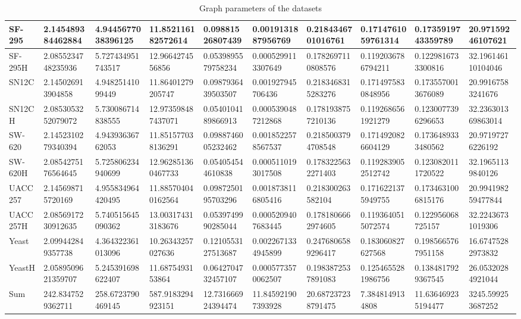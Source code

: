 \documentclass{article}
\begin{document}
\begin{table}[!ht]
\begin{tabular}{|l|l|l|l|l|l|l|l|l|l|}
        SF-295 & 2.145489384462884 & 4.9445677038396125 & 11.852116182572614 & 0.09881526807439 & 0.0019131887956769 & 0.2184346701016761 & 0.1714761059761314 & 0.1735919743359789 & 20.97159246107621 \\ \hline
        SF-295H & 2.0855234748235936 & 5.727434951743517 & 12.9664274556856 & 0.0539895579758234 & 0.0005299113307649 & 0.1782697110808576 & 0.1192036786794211 & 0.1229816733300816 & 32.196146110104046 \\ \hline
        SN12C & 2.145026913904858 & 4.94825141099449 & 11.86401279205747 & 0.0987936439503507 & 0.001927945706436 & 0.2183468315283276 & 0.1714975830848956 & 0.1735570013676089 & 20.99167583241676 \\ \hline
        SN12CH & 2.0853053252079072 & 5.730086714838555 & 12.973598487437071 & 0.0540104189866913 & 0.0005390487212868 & 0.1781938757210136 & 0.1192686561921279 & 0.1230077396296653 & 32.236301369863014 \\ \hline
        SW-620 & 2.1452310279340394 & 4.94393636762053 & 11.851577038136291 & 0.0988746005232462 & 0.0018522578567537 & 0.2185003794708548 & 0.1714920826604129 & 0.1736489333480562 & 20.97197276226192 \\ \hline
        SW-620H & 2.0854275176564645 & 5.725806234940699 & 12.962851360467733 & 0.054054544610838 & 0.0005110193017508 & 0.1783225632271403 & 0.1192839052512742 & 0.1230820111720522 & 32.19651139840126 \\ \hline
        UACC257 & 2.145698715720169 & 4.955834964420495 & 11.885704040162564 & 0.0987250195703296 & 0.0018738116805416 & 0.218300263582104 & 0.1716221375949755 & 0.1734631006815176 & 20.994198259477844 \\ \hline
        UACC257H & 2.0856917230912635 & 5.740515645090362 & 13.003174313183676 & 0.0539749990285044 & 0.0005209407683445 & 0.1781806662974605 & 0.1193640515072574 & 0.122956068725157 & 32.22436731019306 \\ \hline
        Yeast & 2.099442849357738 & 4.364322361013096 & 10.26343257027636 & 0.1210553127513687 & 0.0022671334945899 & 0.2476806589296417 & 0.183060827627568 & 0.1985665767951158 & 16.67475282973832 \\ \hline
        YeastH & 2.0589509621359707 & 5.245391698622407 & 11.6875493153864 & 0.0642704732457107 & 0.0005773570062507 & 0.1983872537891083 & 0.1254655281986756 & 0.1384817929367545 & 26.05320284921044 \\ \hline
        Sum & 242.8347529362711 & 258.6723790469145 & 587.9183294923151 & 12.731666924394474 & 11.845921907393928 & 20.687237238791475 & 7.3848149134808 & 11.636469235194477 & 3245.599253687252 \\ \hline
    \end{tabular}
    \caption{Graph parameters of the datasets}
\end{table}
\end{document}
